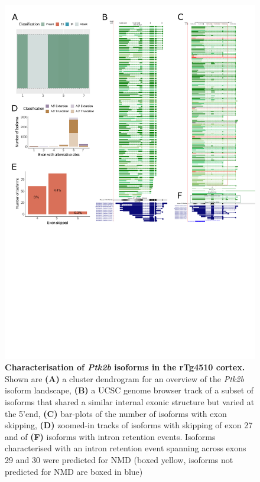 \begin{figure}[htp]
	\centering
	\includegraphics[page=6,trim={0 2cm 0 0},scale = 0.85]{Figures/TargetGenes_Annotation_Portrait.pdf}
	\captionsetup{width=0.95\textwidth}
	\caption[Characterisation of the \textit{Ptk2b} isoform landscape]%
	{\textbf{Characterisation of \textit{Ptk2b} isoforms in the rTg4510 cortex.} Shown are \textbf{(A)} a cluster dendrogram for an overview of the \textit{Ptk2b} isoform landscape, \textbf{(B)} a UCSC genome browser track of a subset of isoforms that shared a similar internal exonic structure but varied at the 5'end, \textbf{(C)} bar-plots of the number of isoforms with exon skipping, \textbf{(D)} zoomed-in tracks of isoforms with skipping of exon 27 and of \textbf{(F)} isoforms with intron retention events. Isoforms characterised with an intron retention event spanning across exons 29 and 30 were predicted for NMD (boxed yellow, isoforms not predicted for NMD are boxed in blue)}    
	\label{fig:ptk2b}
\end{figure}
\restoregeometry

